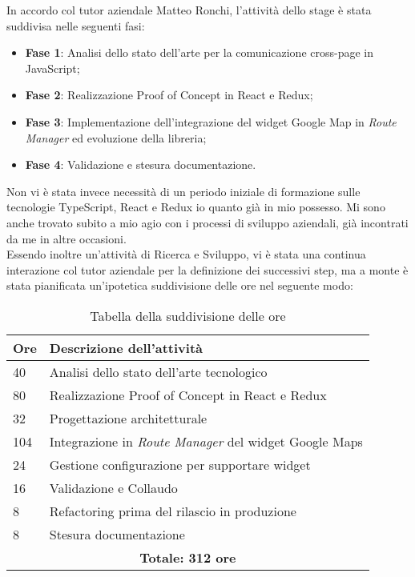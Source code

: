 In accordo col tutor aziendale Matteo Ronchi, l'attività dello stage è stata suddivisa nelle seguenti fasi:

\begin{itemize}
    \item \textbf{Fase 1}: Analisi dello stato dell'arte per la comunicazione cross-page in JavaScript;
    \item \textbf{Fase 2}: Realizzazione Proof of Concept in React e Redux;
    \item \textbf{Fase 3}: Implementazione dell'integrazione del widget Google Map in \textit{Route Manager} ed evoluzione della libreria;
    \item \textbf{Fase 4}: Validazione e stesura documentazione.
\end{itemize}

Non vi è stata invece necessità di un periodo iniziale di formazione sulle tecnologie TypeScript, React e Redux io quanto già in mio possesso. Mi sono anche trovato subito a mio agio con i processi di sviluppo aziendali, già incontrati da me in altre occasioni. \\

Essendo inoltre un'attività di Ricerca e Sviluppo, vi è stata una continua interazione col tutor aziendale per la definizione dei successivi step, ma a monte è stata pianificata un'ipotetica suddivisione delle ore nel seguente modo: \\

\begin{table}[H]
\small
\begin{tabular}{ |p{2cm} |p{10cm}|}
\hline
\textbf{Ore} & \textbf{Descrizione dell'attività} \\ \hline

40 & Analisi dello stato dell'arte tecnologico \\ \hline
80 & Realizzazione Proof of Concept in React e Redux \\ \hline
32 & Progettazione architetturale \\ \hline
104 & Integrazione in \textit{Route Manager} del widget Google Maps \\ \hline
24 & Gestione configurazione per supportare widget \\ \hline
16 & Validazione e Collaudo \\ \hline
8 & Refactoring prima del rilascio in produzione \\ \hline
8 & Stesura documentazione \\ \hline

\multicolumn{2}{|c|}{\textbf{Totale: 312 ore}} \\ \hline

\end{tabular}
\caption{Tabella della suddivisione delle ore}
\end{table}

